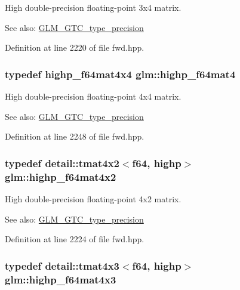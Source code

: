High double-precision floating-point 3x4 matrix. \begin{Desc}
\item[See also:]\hyperlink{group__gtc__type__precision}{GLM\_\-GTC\_\-type\_\-precision} \end{Desc}


Definition at line 2220 of file fwd.hpp.\hypertarget{group__gtc__type__precision_g1ac5d0564721a22765c68c54a0a4f87a}{
\subsubsection[highp\_\-f64mat4]{\setlength{\rightskip}{0pt plus 5cm}typedef highp\_\-f64mat4x4 {\bf glm::highp\_\-f64mat4}}}
\label{group__gtc__type__precision_g1ac5d0564721a22765c68c54a0a4f87a}


High double-precision floating-point 4x4 matrix. \begin{Desc}
\item[See also:]\hyperlink{group__gtc__type__precision}{GLM\_\-GTC\_\-type\_\-precision} \end{Desc}


Definition at line 2248 of file fwd.hpp.\hypertarget{group__gtc__type__precision_gbe9bc3680e7d83a7b34297da518a8117}{
\subsubsection[highp\_\-f64mat4x2]{\setlength{\rightskip}{0pt plus 5cm}typedef detail::tmat4x2$<$f64, highp$>$ {\bf glm::highp\_\-f64mat4x2}}}
\label{group__gtc__type__precision_gbe9bc3680e7d83a7b34297da518a8117}


High double-precision floating-point 4x2 matrix. \begin{Desc}
\item[See also:]\hyperlink{group__gtc__type__precision}{GLM\_\-GTC\_\-type\_\-precision} \end{Desc}


Definition at line 2224 of file fwd.hpp.\hypertarget{group__gtc__type__precision_g0264562b4667b8073b7708efc2280691}{
\subsubsection[highp\_\-f64mat4x3]{\setlength{\rightskip}{0pt plus 5cm}typedef detail::tmat4x3$<$f64, highp$>$ {\bf glm::highp\_\-f64mat4x3}}}
\label{group__gtc__type__precision_g0264562b4667b8073b7708efc2280691}


